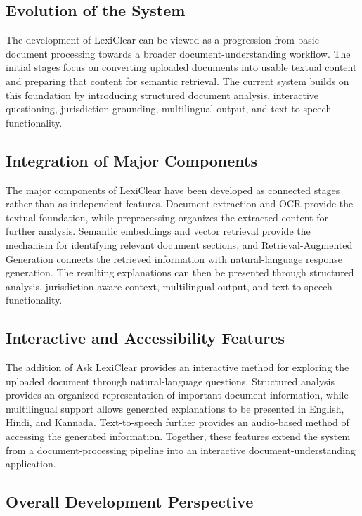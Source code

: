 \documentclass[12pt,a4paper,oneside]{report}
\begin{document}
\subsection{Evolution of the System}

The development of LexiClear can be viewed as a progression from basic
document processing towards a broader document-understanding workflow. The
initial stages focus on converting uploaded documents into usable textual
content and preparing that content for semantic retrieval. The current system
builds on this foundation by introducing structured document analysis,
interactive questioning, jurisdiction grounding, multilingual output, and
text-to-speech functionality. 

\subsection{Integration of Major Components}

The major components of LexiClear have been developed as connected stages
rather than as independent features. Document extraction and OCR provide the
textual foundation, while preprocessing organizes the extracted content for
further analysis. Semantic embeddings and vector retrieval provide the
mechanism for identifying relevant document sections, and Retrieval-Augmented
Generation connects the retrieved information with natural-language response
generation. The resulting explanations can then be presented through
structured analysis, jurisdiction-aware context, multilingual output, and
text-to-speech functionality.

\subsection{Interactive and Accessibility Features}

The addition of Ask LexiClear provides an interactive method for exploring
the uploaded document through natural-language questions. Structured analysis
provides an organized representation of important document information,
while multilingual support allows generated explanations to be presented in
English, Hindi, and Kannada. Text-to-speech further provides an audio-based
method of accessing the generated information. Together, these features
extend the system from a document-processing pipeline into an interactive
document-understanding application.

\subsection{Overall Development Perspective}
\end{document}

